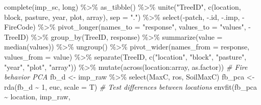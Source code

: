 \documentclass[
]{article}
\newenvironment{Shaded}{\begin{snugshade}}{\end{snugshade}}
\newcommand{\AttributeTok}[1]{\textcolor[rgb]{0.77,0.63,0.00}{#1}}
\newcommand{\CommentTok}[1]{\textcolor[rgb]{0.56,0.35,0.01}{\textit{#1}}}
\newcommand{\DecValTok}[1]{\textcolor[rgb]{0.00,0.00,0.81}{#1}}
\newcommand{\FunctionTok}[1]{\textcolor[rgb]{0.00,0.00,0.00}{#1}}
\newcommand{\NormalTok}[1]{#1}
\newcommand{\OtherTok}[1]{\textcolor[rgb]{0.56,0.35,0.01}{#1}}
\newcommand{\SpecialCharTok}[1]{\textcolor[rgb]{0.00,0.00,0.00}{#1}}
\newcommand{\StringTok}[1]{\textcolor[rgb]{0.31,0.60,0.02}{#1}}
\begin{document}
\begin{Shaded}
\begin{Highlighting}[]
      \FunctionTok{complete}\NormalTok{(imp\_sc, }\StringTok{\textquotesingle{}long\textquotesingle{}}\NormalTok{) }\SpecialCharTok{\%\textgreater{}\%}
      \FunctionTok{as\_tibble}\NormalTok{() }\SpecialCharTok{\%\textgreater{}\%}
      \FunctionTok{unite}\NormalTok{(}\StringTok{"TreeID"}\NormalTok{, }\FunctionTok{c}\NormalTok{(location, block, pasture,}
\NormalTok{                        year, plot, array), }\AttributeTok{sep =} \StringTok{"."}\NormalTok{) }\SpecialCharTok{\%\textgreater{}\%}
      \FunctionTok{select}\NormalTok{(}\SpecialCharTok{{-}}\NormalTok{patch, }\SpecialCharTok{{-}}\NormalTok{.id, }\SpecialCharTok{{-}}\NormalTok{.imp, }\SpecialCharTok{{-}}\NormalTok{FireCode) }\SpecialCharTok{\%\textgreater{}\%}
      \FunctionTok{pivot\_longer}\NormalTok{(}\AttributeTok{names\_to =} \StringTok{"response"}\NormalTok{, }
                   \AttributeTok{values\_to =} \StringTok{"values"}\NormalTok{, }
                   \SpecialCharTok{{-}}\NormalTok{TreeID) }\SpecialCharTok{\%\textgreater{}\%}
      \FunctionTok{group\_by}\NormalTok{(TreeID, response) }\SpecialCharTok{\%\textgreater{}\%}
      \FunctionTok{summarize}\NormalTok{(}\AttributeTok{value =} \FunctionTok{median}\NormalTok{(values)) }\SpecialCharTok{\%\textgreater{}\%}
      \FunctionTok{ungroup}\NormalTok{() }\SpecialCharTok{\%\textgreater{}\%}
      \FunctionTok{pivot\_wider}\NormalTok{(}\AttributeTok{names\_from =}\NormalTok{ response, }
                  \AttributeTok{values\_from =}\NormalTok{ value) }\SpecialCharTok{\%\textgreater{}\%}
      \FunctionTok{separate}\NormalTok{(TreeID, }\FunctionTok{c}\NormalTok{(}\StringTok{"location"}\NormalTok{, }\StringTok{"block"}\NormalTok{, }\StringTok{"pasture"}\NormalTok{,}
                         \StringTok{"year"}\NormalTok{, }\StringTok{"plot"}\NormalTok{, }\StringTok{"array"}\NormalTok{)) }\SpecialCharTok{\%\textgreater{}\%} 
      \FunctionTok{mutate}\NormalTok{(}\FunctionTok{across}\NormalTok{(location}\SpecialCharTok{:}\NormalTok{array, as.factor))}
  \CommentTok{\# Fire behavior PCA }
\NormalTok{    fb\_d }\OtherTok{\textless{}{-}} 
\NormalTok{      imp\_raw }\SpecialCharTok{\%\textgreater{}\%}
      \FunctionTok{select}\NormalTok{(MaxC, ros, SoilMaxC) }
\NormalTok{    fb\_pca }\OtherTok{\textless{}{-}} \FunctionTok{rda}\NormalTok{(fb\_d }\SpecialCharTok{\textasciitilde{}} \DecValTok{1}\NormalTok{, }\StringTok{\textquotesingle{}euc\textquotesingle{}}\NormalTok{, }\AttributeTok{scale =}\NormalTok{ T)}
  \CommentTok{\# Test differences between locations }
    \FunctionTok{envfit}\NormalTok{(fb\_pca }\SpecialCharTok{\textasciitilde{}}\NormalTok{ location, imp\_raw, }

\end{Highlighting}
\end{Shaded}
\end{document}
